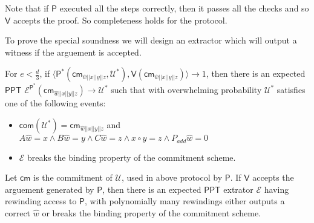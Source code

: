 \documentclass[runningheads]{llncs}
\newcommand{\innp}[2]{\langle #1,#2\rangle}
\def\ppt{\mathsf{PPT}}
\def\extrac{\mathcal{E}}
\def\prover{\mathsf{P}}
\def\verifier{\mathsf{V}}
\def\cm{\mathsf{cm}} %
\def\com{\mathsf{com}} %
\def\extwit{\hat{w}} %
\def\calU{\mathcal{U}}
\begin{document}
	Note that if $\prover$ executed all the steps correctly, then it passes all the checks and so $\verifier$ accepts the proof. So completeness holds for the protocol.
	
	To prove the special soundness we will design an extractor which will output a witness if the arguement is accepted.
	
	\begin{theorem}
		For $e < \frac{d}{3}$, if $\innp{\prover^*(\cm_{\extwit||x||y||z}, \calU^*)}{\verifier(\cm_{\extwit||x||y||z})} \rightarrow 1$, then there is an expected $\ppt$ $\extrac^{\prover^*}(\cm_{\extwit||x||y||z}) \rightarrow \calU^*$ such that with overwhelming probability $\calU^*$ satisfies one of the following events:
		\begin{itemize}
			\item $\com(\calU^*)=\cm_{\extwit||x||y||z}$ and $A\extwit = x \wedge B \extwit = y \wedge C \extwit = z \wedge x\circ y =z \wedge P_{add} \extwit = 0$
			\item $\extrac$ breaks the binding property of the commitment scheme.
			
		\end{itemize}
		Let $\cm$ is the commitment of $\calU$, used in above protocol by $\prover$. If $\verifier$ accepts the arguement generated by $\prover$, then there is an expected $\ppt$ extrator $\extrac$ having rewinding access to $\prover$, with polynomially many rewindings either outputs a correct $\extwit$ or breaks the binding property of the commitment scheme.
	\end{theorem}
\end{document}
